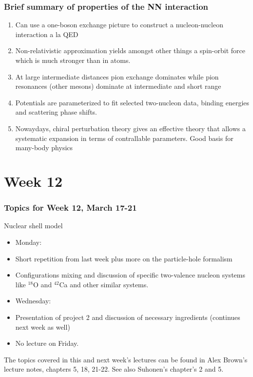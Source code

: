 \documentclass[compress]{beamer}
\begin{document}
\frame
{
  \frametitle{Brief summary of properties of the NN interaction}
\begin{small}
{\scriptsize
    \begin{enumerate}
\item Can use a one-boson exchange picture to construct a nucleon-nucleon
interaction a la QED
\item Non-relativistic approximation yields amongst other things a spin-orbit
force which is much stronger than in atoms.
\item At large intermediate distances pion exchange dominates while 
pion resonances (other mesons) dominate at intermediate and short range 
\item  Potentials are parameterized to fit selected two-nucleon data, binding energies and scattering phase shifts.
\item Nowaydays, chiral perturbation theory gives an effective theory that allows a systematic expansion in terms of contrallable parameters. Good basis for many-body physics
    \end{enumerate}
}
\end{small}
}






\section[Week 12]{Week 12}

\frame
{
  \frametitle{Topics for Week 12, March 17-21}
  \begin{block}{Nuclear shell model}
\begin{itemize}
\item Monday:
\item Short repetition from last week plus more on the particle-hole formalism
\item Configurations mixing and discussion of specific two-valence nucleon systems like $^{18}$O and $^{42}$Ca and other similar systems.
\item Wednesday:
\item Presentation of project 2 and discussion of necessary ingredients (continues next week as well)
\item No lecture on Friday.
\end{itemize}
The topics covered in this and next week's lectures can be found in Alex Brown's lecture notes, chapters 5, 18, 21-22.
See also Suhonen's chapter's 2 and 5.
  \end{block}
} 
\end{document}
